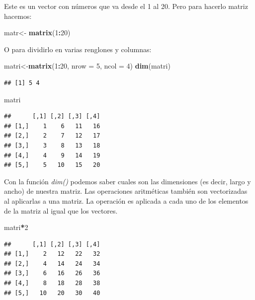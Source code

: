\documentclass[
]{book}
\newenvironment{Shaded}{\begin{snugshade}}{\end{snugshade}}
\newcommand{\AttributeTok}[1]{\textcolor[rgb]{0.13,0.29,0.53}{#1}}
\newcommand{\DecValTok}[1]{\textcolor[rgb]{0.00,0.00,0.81}{#1}}
\newcommand{\FunctionTok}[1]{\textcolor[rgb]{0.13,0.29,0.53}{\textbf{#1}}}
\newcommand{\NormalTok}[1]{#1}
\newcommand{\OtherTok}[1]{\textcolor[rgb]{0.56,0.35,0.01}{#1}}
\newcommand{\SpecialCharTok}[1]{\textcolor[rgb]{0.81,0.36,0.00}{\textbf{#1}}}
\begin{document}
Este es un vector con números que va desde el 1 al 20.
Pero para hacerlo matriz hacemos:

\begin{Shaded}
\begin{Highlighting}[]
\NormalTok{matr}\OtherTok{\textless{}{-}} \FunctionTok{matrix}\NormalTok{(}\DecValTok{1}\SpecialCharTok{:}\DecValTok{20}\NormalTok{)}
\end{Highlighting}
\end{Shaded}

O para dividirlo en varias renglones y columnas:

\begin{Shaded}
\begin{Highlighting}[]
\NormalTok{matri}\OtherTok{\textless{}{-}}\FunctionTok{matrix}\NormalTok{(}\DecValTok{1}\SpecialCharTok{:}\DecValTok{20}\NormalTok{, }\AttributeTok{nrow =} \DecValTok{5}\NormalTok{, }\AttributeTok{ncol =} \DecValTok{4}\NormalTok{)}
\FunctionTok{dim}\NormalTok{(matri)}
\end{Highlighting}
\end{Shaded}

\begin{verbatim}
## [1] 5 4
\end{verbatim}

\begin{Shaded}
\begin{Highlighting}[]
\NormalTok{matri}
\end{Highlighting}
\end{Shaded}

\begin{verbatim}
##      [,1] [,2] [,3] [,4]
## [1,]    1    6   11   16
## [2,]    2    7   12   17
## [3,]    3    8   13   18
## [4,]    4    9   14   19
## [5,]    5   10   15   20
\end{verbatim}

Con la función \emph{dim()} podemos saber cuales son las dimensiones (es decir, largo y ancho) de nuestra matriz.
Las operaciones aritméticas también son vectorizadas al aplicarlas a una matriz.
La operación es aplicada a cada uno de los elementos de la matriz al igual que los vectores.

\begin{Shaded}
\begin{Highlighting}[]
\NormalTok{matri}\SpecialCharTok{*}\DecValTok{2}
\end{Highlighting}
\end{Shaded}

\begin{verbatim}
##      [,1] [,2] [,3] [,4]
## [1,]    2   12   22   32
## [2,]    4   14   24   34
## [3,]    6   16   26   36
## [4,]    8   18   28   38
## [5,]   10   20   30   40
\end{verbatim}
\end{document}
